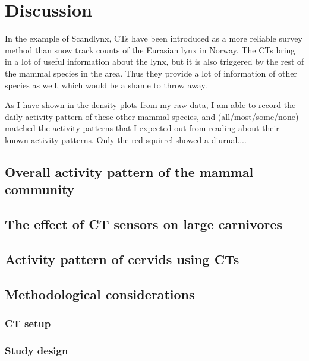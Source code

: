\chapter{Discussion}

In the example of Scandlynx, CTs have been introduced as a more reliable survey method than snow track counts of the Eurasian lynx in Norway. The CTs bring in a lot of useful information about the lynx, but it is also triggered by the rest of the mammal species in the area. Thus they provide a lot of information of other species as well, which would be a shame to throw away.

As I have shown %
in the density plots from my raw data, I am able to record the daily activity pattern of these other mammal species, and (all/most/some/none) matched the activity-patterns that I expected out from reading about their known activity patterns. %
Only the red squirrel showed a diurnal....


\section{Overall activity pattern of the mammal community}

\section{The effect of CT sensors on large carnivores}

\section{Activity pattern of cervids using CTs}

\section{Methodological considerations}

\subsection{CT setup}

\subsection{Study design}

